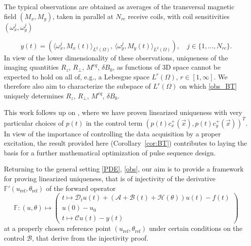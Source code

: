 \documentclass[12pt]{article}
\newcommand\MRIdetails[1]{}
\newcommand\DD{\mathcal{D}}
\newcommand\calA{\mathcal{A}}
\newcommand\BB{\mathcal{B}}
\newcommand\HH{\mathcal{H}}
\newcommand\coilsens{\omega}
\newcommand\vecr{\vec{x}}
\newcommand\Ncoil{N_{rc}}
\begin{document}
The typical observations are obtained as averages of the transversal magnetic field $(M_x,M_y)$, taken in parallel at ${\Ncoil}$ receive coils, with coil sensitivities $(\coilsens^j_x,\coilsens^j_y)$\MRIdetails{The fact that both components of the transversal magnetic field can be observed is achieved by qudrature demodulation, cf. Nishimura page 77.} 
\MRIdetails{The vector $(\coilsens^j_x,\coilsens^j_y)$ plays the role of the (transversally oriented) magnetic flux density per unit current of the $j$th receive coil; Faraday's law implies that the electromotive force (which is in fact work per charge rather than work per length) equals the negative time derivative of the magnetic flux through the coil, which in its turn by the reciprocity principle equals the inner product of the coil magnetic flux density per unit current with the magnetization.}
\begin{equation}\label{obs_BT}
y(t)=(\langle \coilsens^j_x,M_x(t)\rangle_{L^2(\Omega)},\,\langle \coilsens^j_y,M_y(t)\rangle_{L^2(\Omega)}), \quad j\in\{1,\ldots,{\Ncoil}\}.
\end{equation}
In view of the lower dimensionality of these observations, uniqueness of the imaging quantities $R_z$, $R_\perp$, $M^{eq}$, $\delta B_0$,  as functions of 3D space cannot be expected to hold on all of, e.g., a Lebesgue space $L^r(\Omega)$, $r\in[1,\infty]$. We therefore also aim to characterize the subspace of $L^r(\Omega)$ on which \eqref{obs_BT} uniquely determines $R_z$, $R_\perp$, $M^{eq}$, $\delta B_0$.

This work follows up on \cite{MRI-uniqueness}, where we have proven linearized uniqueness with very particular choices of $p(t)$ in the control term $(p(t)c^+_{x}(\vecr),p(t)c^+_{y}(\vecr))^T$.
In view of the importance of controlling the data acquisition by a proper excitation, the result provided here (Corollary~\ref{cor:BT}) contributes to laying the basis for a further mathematical optimization of pulse sequence design.

\medskip

Returning to the general setting \eqref{PDE}, \eqref{obs}, our aim is to provide a framework for proving 
linearized uniqueness, 
that is of injectivity of 
the derivative $\mathbb{F}'(u_{\text{ref}},\theta_{\text{ref}})$ of 
the forward operator
\begin{equation}\label{F}
\mathbb{F}:(u,\theta)\mapsto \left(\begin{array}{l}
t\mapsto\DD_t u(t) +(\calA+ \BB(t)+\HH(\theta))u(t)-f(t)\\
u(0)-u_0\\
t\mapsto\mathcal{C}u(t)-y(t)
\end{array}\right)
\end{equation}
at a properly chosen reference point $(u_{\text{ref}},\theta_{\text{ref}})$ under certain conditions on the control $\BB$, that derive from the injectivity proof.
\end{document}
